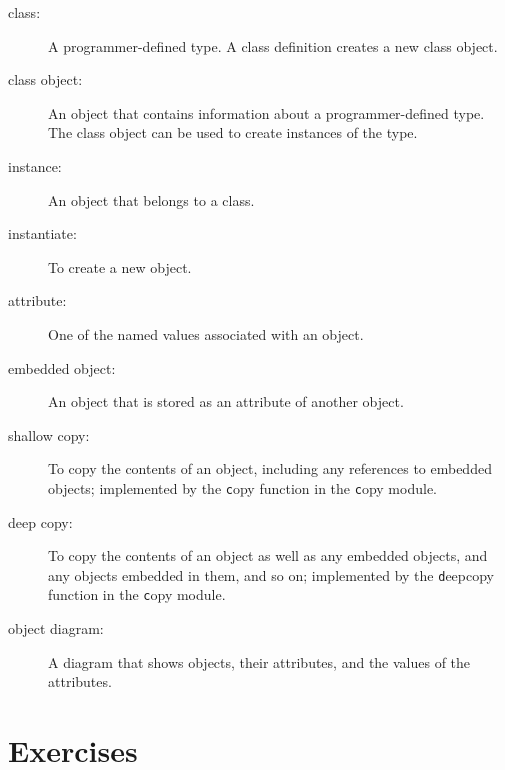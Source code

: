 \documentclass[
DIV=11,
fontsize=13,
twoside,
headinclude=false,
titlepage=firstiscover,
abstract=true,
headsepline=true,
footsepline=true,
chapterprefix=true, %
headings=big,
bibliography=totoc,%
captions=tableheading
]{scrbook}
\theoremstyle{definition}
\begin{document}
\begin{description}

\item[class:] A programmer-defined type.  A class definition creates a new
class object.

\item[class object:] An object that contains information about a
programmer-defined type.  The class object can be used to create instances
of the type.

\item[instance:] An object that belongs to a class.

\item[instantiate:] To create a new object.

\item[attribute:] One of the named values associated with an object.

\item[embedded object:] An object that is stored as an attribute
of another object.

\item[shallow copy:] To copy the contents of an object, including
any references to embedded objects;
implemented by the {\texttt copy} function in the {\texttt copy} module.

\item[deep copy:] To copy the contents of an object as well as any
embedded objects, and any objects embedded in them, and so on;
implemented by the {\texttt deepcopy} function in the {\texttt copy} module.

\item[object diagram:] A diagram that shows objects, their
attributes, and the values of the attributes.

\end{description}


\section{Exercises}
\end{document}
